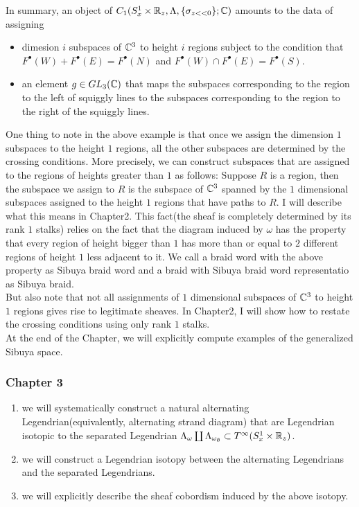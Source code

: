 In summary, an object of $C_1(S^1_x\times \mathbb{R}_z,\Lambda,\{\sigma_{z<<0}\};\mathbb{C})$ amounts to the data of assigning 
\begin{itemize}
\item  dimesion $i$ subspaces of $\mathbb{C}^3$ to height $i$ regions subject to the condition that $F^\bullet(W)+F^\bullet(E) = F^\bullet(N)$ and $F^\bullet(W)\cap F^\bullet(E) = F^\bullet(S)$.

\item an element $g \in GL_3(\mathbb{C})$ that maps the subspaces corresponding to the region to the left of squiggly lines to the subspaces corresponding to the region to the right of the squiggly lines.
\end{itemize}
One thing to note in the above example is that once we assign the dimension $1$ subspaces to the height $1$ regions, all the other subspaces are determined by the crossing conditions. More precisely, we can construct subspaces that are assigned to the regions of heights greater than $1$ as follows: Suppose $R$ is a region, then the subspace we assign to $R$ is the subspace of $\mathbb{C}^3$ spanned by the $1$ dimensional subspaces assigned to the height $1$ regions that have paths to $R$. I will describe what this means in Chapter2. This fact(the sheaf is completely determined by its rank $1$ stalks) relies on the fact that the diagram induced by $\omega$ has the property that every region of height bigger than $1$ has more than or equal to $2$ different regions of height $1$ less adjacent to it. We call a braid word with the above property as Sibuya braid word and a braid with Sibuya braid word representatio as Sibuya braid.\\
But also note that not all assignments of $1$ dimensional subspaces of $\mathbb{C}^3$ to height $1$ regions gives rise to legitimate sheaves. In Chapter2, I will show how to restate the crossing conditions using only rank $1$ stalks.\\
At the end of the Chapter, we will explicitly compute examples of the generalized Sibuya space.
\subsubsection*{Chapter 3}
\begin{enumerate}[label = (\roman*)]
\item we will systematically construct a natural alternating Legendrian(equivalently, alternating strand diagram) that are Legendrian isotopic to the separated Legendrian $\Lambda_\omega \coprod \Lambda_{\omega_\emptyset} \subset T^\infty(S^1_x \times \mathbb{R}_z)$.

\item we will construct a Legendrian isotopy between the alternating Legendrians and the separated Legendrians.

\item we will explicitly describe the sheaf cobordism induced by the above isotopy.
\end{enumerate}

